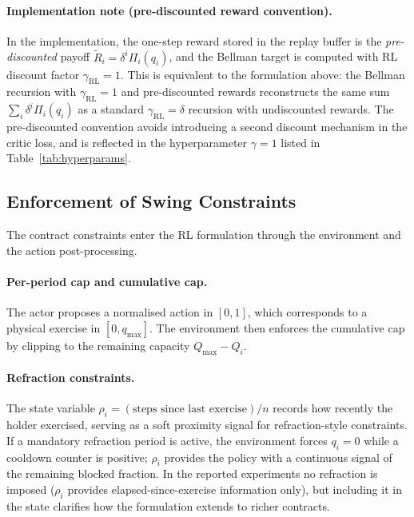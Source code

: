 \documentclass[a4paper,fleqn]{cas-dc}
\begin{document}
\paragraph{Implementation note (pre-discounted reward convention).}
In the implementation, the one-step reward stored in the replay buffer is the \emph{pre-discounted} payoff $\tilde R_i = \delta^i \Pi_i(q_i)$, and the Bellman target is computed with RL discount factor $\gamma_{\mathrm{RL}} = 1$.
This is equivalent to the formulation above: the Bellman recursion with $\gamma_{\mathrm{RL}} = 1$ and pre-discounted rewards reconstructs the same sum $\sum_i \delta^i \Pi_i(q_i)$ as a standard $\gamma_{\mathrm{RL}} = \delta$ recursion with undiscounted rewards.
The pre-discounted convention avoids introducing a second discount mechanism in the critic loss, and is reflected in the hyperparameter $\gamma = 1$ listed in Table~\ref{tab:hyperparams}.

\subsection{Enforcement of Swing Constraints}

The contract constraints enter the RL formulation through the environment and the action post-processing.

\paragraph{Per-period cap and cumulative cap.}
The actor proposes a normalised action in $[0,1]$, which corresponds to a physical exercise in $[0,q_{\max}]$. The environment then enforces the cumulative cap by clipping to the remaining capacity $Q_{\max} - Q_i$.

\paragraph{Refraction constraints.}
The state variable $\rho_i = (\text{steps since last exercise}) / n$ records how recently the holder exercised, serving as a soft proximity signal for refraction-style constraints. If a mandatory refraction period is active, the environment forces $q_i = 0$ while a cooldown counter is positive; $\rho_i$ provides the policy with a continuous signal of the remaining blocked fraction. In the reported experiments no refraction is imposed ($\rho_i$ provides elapsed-since-exercise information only), but including it in the state clarifies how the formulation extends to richer contracts.
\end{document}
